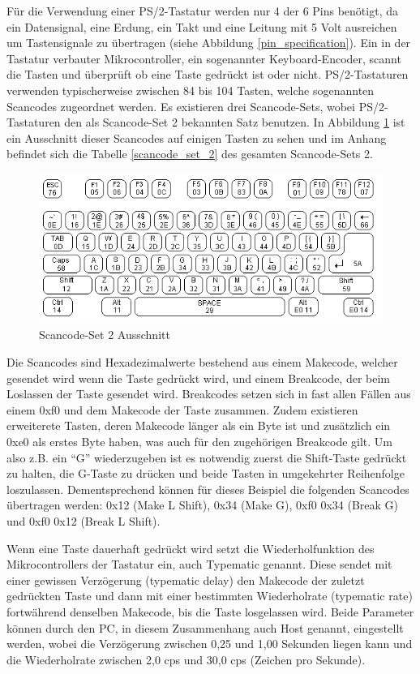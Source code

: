 Für die Verwendung einer PS/2-Tastatur werden nur 4 der 6 Pins benötigt, da ein Datensignal, eine Erdung, ein Takt und eine Leitung mit 5 Volt ausreichen um Tastensignale zu übertragen (siehe Abbildung \ref{pin_specification}). Ein in der Tastatur verbauter Mikrocontroller, ein sogenannter Keyboard-Encoder, scannt die Tasten und überprüft ob eine Taste gedrückt ist oder nicht. PS/2-Tastaturen verwenden typischerweise zwischen 84 bis 104 Tasten, welche sogenannten Scancodes zugeordnet werden. Es existieren drei Scancode-Sets, wobei PS/2-Tastaturen den als Scancode-Set 2 bekannten Satz benutzen. In Abbildung \ref{scancodes} \cite{scancodes} ist ein Ausschnitt dieser Scancodes auf einigen Tasten zu sehen und im Anhang befindet sich die Tabelle \ref{scancode_set_2} des gesamten Scancode-Sets 2.

\begin{figure}
  \centering
  \includegraphics[width=1\textwidth]{images/scancodes.jpg}
  \caption{Scancode-Set 2 Ausschnitt}
  \label{scancodes}
\end{figure}

Die Scancodes sind Hexadezimalwerte bestehend aus einem Makecode, welcher gesendet wird wenn die Taste gedrückt wird, und einem Breakcode, der beim Loslassen der Taste gesendet wird. Breakcodes setzen sich in fast allen Fällen aus einem 0xf0 und dem Makecode der Taste zusammen. Zudem existieren erweiterete Tasten, deren Makecode länger als ein Byte ist und zusätzlich ein 0xe0 als erstes Byte haben, was auch für den zugehörigen Breakcode gilt. Um also z.B. ein ``G'' wiederzugeben ist es notwendig zuerst die Shift-Taste gedrückt zu halten, die G-Taste zu drücken und beide Tasten in umgekehrter Reihenfolge loszulassen. Dementsprechend können für dieses Beispiel die folgenden Scancodes übertragen werden: 0x12 (Make L Shift), 0x34 (Make G), 0xf0 0x34 (Break G) und 0xf0 0x12 (Break L Shift).

Wenn eine Taste dauerhaft gedrückt wird setzt die Wiederholfunktion des Mikrocontrollers der Tastatur ein, auch Typematic genannt. Diese sendet mit einer gewissen Verzögerung (typematic delay) den Makecode der zuletzt gedrückten Taste und dann mit einer bestimmten Wiederholrate (typematic rate) fortwährend denselben Makecode, bis die Taste losgelassen wird. Beide Parameter können durch den PC, in diesem Zusammenhang auch Host genannt, eingestellt werden, wobei die Verzögerung zwischen 0,25 und 1,00 Sekunden liegen kann und die Wiederholrate zwischen 2,0 cps und 30,0 cps (Zeichen pro Sekunde).

